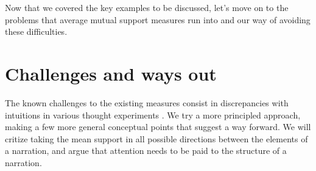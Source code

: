\documentclass[10pt,]{scrartcl}
\begin{document}













Now that we covered the key examples to be discussed, let's move on to  the problems that average mutual support measures run into and our way of avoiding these difficulties. 


\section{Challenges and ways out}\label{sec:challenges}


The known challenges to the existing measures  consist in discrepancies with intuitions in various thought experiments \citep{Merricks1995,shogenji1999conducive, Akiba2000Shogenjis, Shogenji2001Reply, bovens2004bayesian,Siebel2004On-Fitelsons-me,siebel2006against,Shogenji2006Why,crupi2007BayesianMeasuresEvidential, koscholke2016evaluating, Schippers2019General}. We try a more principled approach,  making a few more general conceptual points that suggest a way forward. We will critize  taking the mean support in all possible directions between the elements of a narration,  and argue that attention needs to be paid to the structure of a narration.
\end{document}
